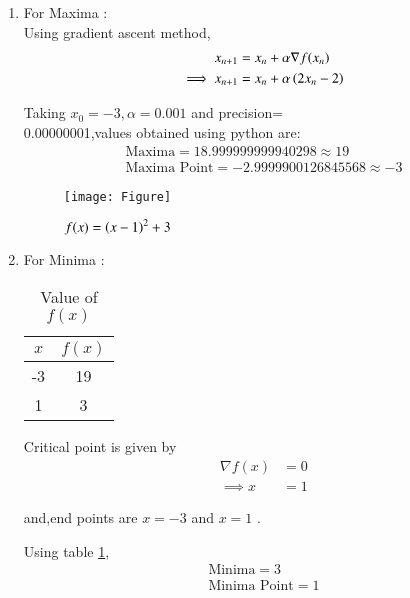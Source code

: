 \documentclass[journal,12pt,twocolumn]{IEEEtran}
\begin{document}
\begin{enumerate}
    \item For Maxima : \\
    Using gradient ascent method,
    \begin{align}
        x_{n+1} &= x_n + \alpha \nabla f(x_n) \\
        \implies x_{n+1} &= x_n + \alpha \left(2x_n-2\right)
    \end{align}
    
    Taking $x_0=-3,\alpha=0.001$ and precision= \\ 0.00000001,values obtained using python are:
    \begin{align}
        \boxed{\text{Maxima} = 18.999999999940298 \approx 19 }\\
        \boxed{\text{Maxima Point} = -2.9999900126845568 \approx -3}
    \end{align}
    
    \begin{figure}[!ht]
    \centering
    \texttt{[image: Figure]}
    \caption{$f(x)=\left(x-1\right)^2+3$}
    \label{f(x)}	
    \end{figure}
    \item For Minima : \\
    
    \begin{table}[!ht]
    \centering
    \begin{tabular}{|c|c|} 
    \hline
    $x$ & $f(x)$ \\
    \hline
    -3& 19 \\
    \hline
   1 & 3 \\
    \hline
    \end{tabular}
    \caption{Value of $f(x)$}
    \label{tab:table1}
    \end{table}
    
    Critical point is given by
    \begin{align}
        \nabla f(x) &= 0 \\
        \implies x &= 1
    \end{align}
    
    and,end points are $x=-3$ and $x=1$ .
    
    Using table \ref{tab:table1},
    \begin{align}
        \boxed{\text{Minima} = 3}\\
        \boxed{\text{Minima Point} = 1}
    \end{align}
    
\end{enumerate}
\end{document}
